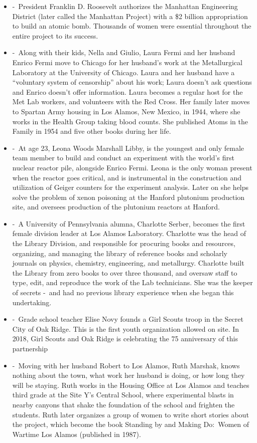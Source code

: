 \documentclass[12pt,a4paper]{article}
\begin{document}
\begin{enumerate}
\begin{itemize}
    \item[]  -\ President Franklin D. Roosevelt authorizes the Manhattan Engineering District (later called the Manhattan Project) with a \$2 billion appropriation to build an atomic bomb. Thousands of women were essential throughout the entire project to its success.
    \item[]  -\ Along with their kids, Nella and Giulio, Laura Fermi and her husband Enrico Fermi move to Chicago for her husband's work at the Metallurgical Laboratory at the University of Chicago. Laura and her husband have a ``voluntary system of censorship'' about his work; Laura doesn't ask questions and Enrico doesn't offer information. Laura becomes a regular host for the Met Lab workers, and volunteers with the Red Cross. Her family later moves to Spartan Army housing in Los Alamos, New Mexico, in 1944, where she works in the Health Group taking blood counts. She published Atoms in the Family in 1954 and five other books during her life.
    \item[]  -\ At age 23, Leona Woods Marshall Libby, is the youngest and only female team member to build and conduct an experiment with the world's first nuclear reactor pile, alongside Enrico Fermi. Leona is the only woman present when the reactor goes critical, and is instrumental in the construction and utilization of Geiger counters for the experiment analysis. Later on she helps solve the problem of xenon poisoning at the Hanford plutonium production site, and oversees production of the plutonium reactors at Hanford.
    \item[]  -\ A University of Pennsylvania alumna, Charlotte Serber, becomes the first female division leader at Los Alamos Laboratory. Charlotte was the head of the Library Division, and responsible for procuring books and resources, organizing, and managing the library of reference books and scholarly journals on physics, chemistry, engineering, and metallurgy. Charlotte built the Library from zero books to over three thousand, and oversaw staff to type, edit, and reproduce the work of the Lab technicians. She was the keeper of secrets -\ and had no previous library experience when she began this undertaking.
    \item[]  -\ Grade school teacher Elise Novy founds a Girl Scouts troop in the Secret City of Oak Ridge. This is the first youth organization allowed on site. In 2018, Girl Scouts and Oak Ridge is celebrating the 75 anniversary of this partnership
    \item[]  -\ Moving with her husband Robert to Los Alamos, Ruth Marshak, knows nothing about the town, what work her husband is doing, or how long they will be staying. Ruth works in the Housing Office at Los Alamos and teaches third grade at the Site Y's Central School, where experimental blasts in nearby canyons that shake the foundation of the school and frighten the students. Ruth later organizes a group of women to write short stories about the project, which become the book Standing by and Making Do:\ Women of Wartime Los Alamos (published in 1987).

\end{itemize}
\end{enumerate}
\end{document}
